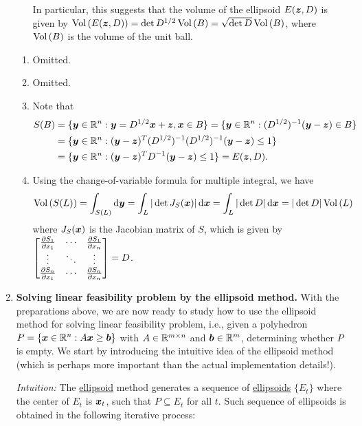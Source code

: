 \begin{enumerate}
\begin{enumerate}
\begin{note}
In particular, this suggests that the volume of the ellipsoid \(E(\bm{z},D)\)
is given by \(\operatorname{Vol}\left(E(\bm{z},D)\right)=\det D^{1/2}\operatorname{Vol}\left(B\right)=\sqrt{\det D}\operatorname{Vol}\left(B\right)\),
where \(\operatorname{Vol}\left(B\right)\) is the volume of the unit ball.
\end{note}
\end{enumerate}
\begin{pf}
\begin{enumerate}
\item Omitted.
\item Omitted.
\item Note that
\begin{align*}
S(B)&=\{\bm{y}\in\mathbb{R}^n:\bm{y}=D^{1/2}\bm{x}+\bm{z},\bm{x}\in B\}
=\{\bm{y}\in\mathbb{R}^n:(D^{1/2})^{-1}(\bm{y}-\bm{z})\in B\} \\
&=\{\bm{y}\in\mathbb{R}^n:(\bm{y}-\bm{z})^{T}(D^{1/2})^{-1}
(D^{1/2})^{-1}(\bm{y}-\bm{z})\le 1\} \\
&=\{\bm{y}\in\mathbb{R}^n:(\bm{y}-\bm{z})^{T}D^{-1}(\bm{y}-\bm{z})\le 1\}
=E(\bm{z},D).
\end{align*}
\item Using the change-of-variable formula for multiple integral, we have
\[
\vol{S(L)}=\int_{S(L)}^{}\odif{\vect{y}}
=\int_{L}^{}|\det J_{S}(\vect{x})|\odif{\vect{x}}
=\int_{L}^{}|\det D|\odif{\vect{x}}
=|\det D|\vol{L}
\]
where \(J_{S}(\bm{x})\) is the Jacobian matrix of \(S\), which is given by
\(\begin{bmatrix}\pdv{S_1}{x_1}&\cdots&\pdv{S_1}{x_n} \\
\vdots&\ddots&\vdots \\
\pdv{S_n}{x_1}&\cdots&\pdv{S_n}{x_n} \\
\end{bmatrix}=D\).
\end{enumerate}
\end{pf}
\item \textbf{Solving linear feasibility problem by the ellipsoid method.}
With the preparations above, we are now ready to study how to use the ellipsoid
method for solving linear feasibility problem, i.e., given a polyhedron
\(P=\{\bm{x}\in\mathbb{R}^n:A\bm{x}\ge\bm{b}\}\) with \(A\in\mathbb{R}^{m\times n}\) and
\(\bm{b}\in\mathbb{R}^m\), determining whether \(P\) is empty. We start by
introducing the intuitive idea of the ellipsoid method (which is perhaps more
important than the actual implementation details!).

\emph{Intuition:} 
The \underline{ellipsoid} method generates a sequence of
\underline{ellipsoids} \(\{E_t\}\) where the center of \(E_t\) is
\(\bm{x}_t\), such that \(P\subseteq E_t\) for all \(t\). Such sequence of
ellipsoids is obtained in the following iterative process:


\end{enumerate}
